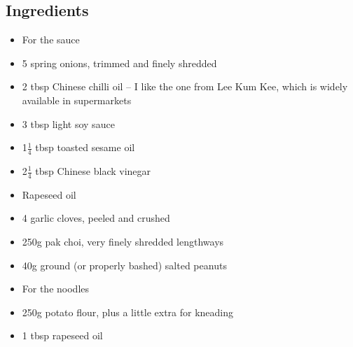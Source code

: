 \documentclass{book}
\begin{document}
\subsection*{Ingredients}
\begin{itemize}
\item For the sauce 
\item 5 spring onions, trimmed and finely shredded
\item 2 tbsp Chinese chilli oil – I like the one from Lee Kum Kee, which is widely available in supermarkets
\item 3 tbsp light soy sauce 
\item 1$\frac{1}{4}$ tbsp toasted sesame oil 
\item 2$\frac{1}{4}$ tbsp Chinese black vinegar
\item Rapeseed oil
\item 4 garlic cloves, peeled and crushed 
\item 250g pak choi, very finely shredded lengthways
\item 40g ground (or properly bashed) salted peanuts
\end{itemize}

\begin{itemize}
\item For the noodles
\item 250g potato flour, plus a little extra for kneading
\item 1 tbsp rapeseed oil
\end{itemize}
\end{document}
